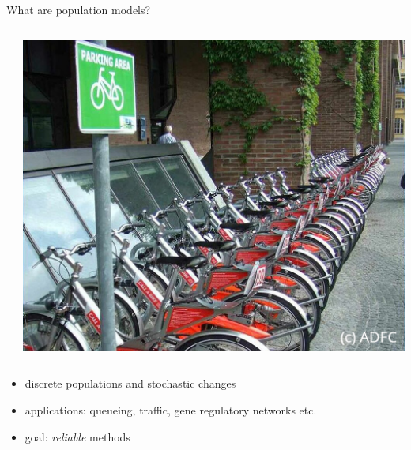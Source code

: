 \documentclass[9pt]{beamer}
\begin{document}
\begin{frame}{What are population models?}
\begin{columns}
\begin{column}{.3\paperwidth}
        \end{column}
        \begin{column}{.3\paperwidth}
            \includegraphics[width=\textwidth]{../gfx/biksharing.jpg}
        \end{column}
    \end{columns}
    \vspace{1em}
  \begin{itemize}
        \item discrete populations and stochastic changes
        \item applications: queueing, traffic, gene regulatory networks etc.
        \item goal: \emph{reliable} methods
  \end{itemize}
\end{frame}
\end{document}
